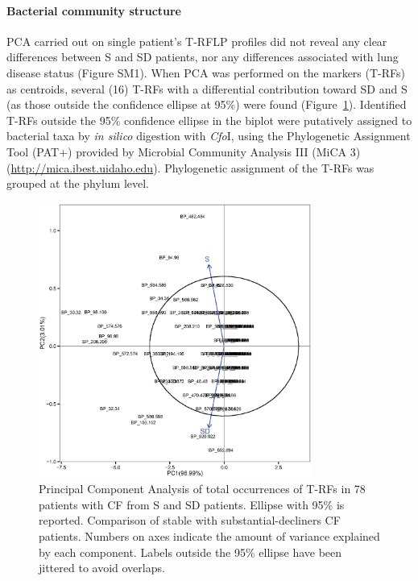 \paragraph{Bacterial community structure} PCA carried out on single patient's T-RFLP profiles did not reveal any clear differences between S and SD patients, nor any differences associated with lung disease status (Figure SM1). When PCA was performed on the markers (T-RFs) as centroids, several (16) T-RFs with a differential contribution toward SD and S (as those outside the confidence ellipse at 95\%) were found (Figure~\ref{fig:fig3condtrf}). Identified T-RFs outside the 95\% confidence ellipse in the biplot were putatively assigned to bacterial taxa by \textit{in silico} digestion with \textit{Cfo}I, using the Phylogenetic Assignment Tool (PAT+) provided by Microbial Community Analysis III (MiCA 3) (\href{http://mica.ibest.uidaho.edu/}{http://mica\-.ibest\-.uidaho\-.edu}). Phylogenetic assignment of the T-RFs was grouped at the phylum level.\\%
\begin{figure}[!tb]
	\centering
	\includegraphics[width=0.8\textwidth]{./figures/Chapter_7/Figure_3_cond_trf}
  	\caption{\label{fig:fig3condtrf}Principal Component Analysis of total occurrences of T-RFs in 78 patients with CF from S and SD patients. Ellipse with 95\% is reported. Comparison of stable with substantial-decliners CF patients. Numbers on axes indicate the amount of variance explained by each component. Labels outside the 95\% ellipse have been jittered to avoid overlaps.}
\end{figure}%
